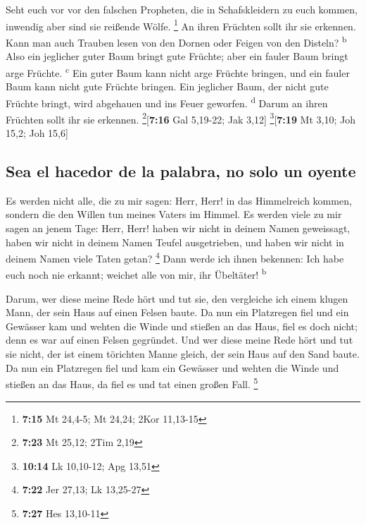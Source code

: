  Seht euch vor vor den falschen Propheten, die in
Schafskleidern zu euch kommen, inwendig aber sind sie reißende Wölfe.
\footnote{\textbf{7:15} Mt 24,4-5; Mt 24,24; 2Kor 11,13-15}
 An ihren Früchten sollt ihr sie erkennen. Kann man auch
Trauben lesen von den Dornen oder Feigen von den Disteln?
\textsuperscript{b}  Also ein jeglicher guter Baum bringt
gute Früchte; aber ein fauler Baum bringt arge Früchte.
\textsuperscript{c}  Ein guter Baum kann nicht arge
Früchte bringen, und ein fauler Baum kann nicht gute Früchte bringen.
 Ein jeglicher Baum, der nicht gute Früchte bringt, wird
abgehauen und ins Feuer geworfen. \textsuperscript{d} 
Darum an ihren Früchten sollt ihr sie erkennen.
\footnote{\textbf{7:23} Mt 25,12; 2Tim 2,19}{[}\textbf{7:16} Gal
5,19-22; Jak 3,12{]} \footnote{\textbf{10:14} Lk 10,10-12; Apg 13,51}{[}\textbf{7:19}
Mt 3,10; Joh 15,2; Joh 15,6{]}

\hypertarget{sea-el-hacedor-de-la-palabra-no-solo-un-oyente}{%
\subsection{Sea el hacedor de la palabra, no solo un
oyente}\label{sea-el-hacedor-de-la-palabra-no-solo-un-oyente}}

 Es werden nicht alle, die zu mir sagen: Herr, Herr! in
das Himmelreich kommen, sondern die den Willen tun meines Vaters im
Himmel.  Es werden viele zu mir sagen an jenem Tage:
Herr, Herr! haben wir nicht in deinem Namen geweissagt, haben wir nicht
in deinem Namen Teufel ausgetrieben, und haben wir nicht in deinem Namen
viele Taten getan? \footnote{\textbf{7:22} Jer 27,13; Lk 13,25-27}
 Dann werde ich ihnen bekennen: Ich habe euch noch nie
erkannt; weichet alle von mir, ihr Übeltäter! \textsuperscript{b}

 Darum, wer diese meine Rede hört und tut sie, den
vergleiche ich einem klugen Mann, der sein Haus auf einen Felsen baute.
 Da nun ein Platzregen fiel und ein Gewässer kam und
wehten die Winde und stießen an das Haus, fiel es doch nicht; denn es
war auf einen Felsen gegründet.  Und wer diese meine Rede
hört und tut sie nicht, der ist einem törichten Manne gleich, der sein
Haus auf den Sand baute.  Da nun ein Platzregen fiel und
kam ein Gewässer und wehten die Winde und stießen an das Haus, da fiel
es und tat einen großen Fall. \footnote{\textbf{7:27} Hes 13,10-11}


